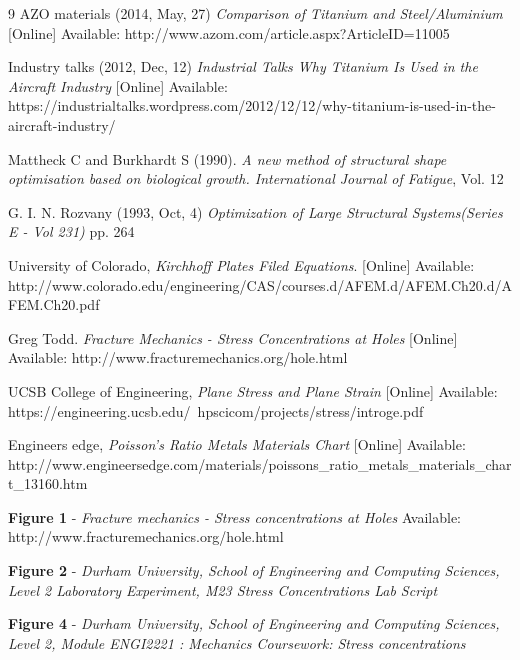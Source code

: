 \documentclass[11pt,twocolumn]{article} %
\begin{document}
\begin{thebibliography} {9} %
AZO materials (2014, May, 27) \textit{Comparison of Titanium and Steel/Aluminium} [Online] Available: http://www.azom.com/article.aspx?ArticleID=11005

Industry talks (2012, Dec, 12) \textit{Industrial Talks Why Titanium Is Used in the Aircraft Industry} [Online] Available: https://industrialtalks.wordpress.com/2012/12/12/why-titanium-is-used-in-the-aircraft-industry/

Mattheck C and Burkhardt S (1990). \textit{A new method of structural shape optimisation based on biological growth. International Journal of Fatigue}, Vol. 12

G. I. N. Rozvany (1993, Oct, 4) \textit{Optimization of Large Structural Systems(Series E - Vol 231)} pp. 264

University of Colorado, \textit{Kirchhoff Plates Filed Equations}. [Online] Available: http://www.colorado.edu/engineering/CAS/courses.d/AFEM.d/AFEM.Ch20.d/AFEM.Ch20.pdf 

Greg Todd. \textit{Fracture Mechanics - Stress Concentrations at Holes} [Online] Available: http://www.fracturemechanics.org/hole.html

UCSB College of Engineering, \textit{Plane Stress and Plane Strain} [Online] Available: https://engineering.ucsb.edu/~hpscicom/projects/stress/introge.pdf

Engineers edge, \textit{Poisson's Ratio Metals Materials Chart} [Online] Available: http://www.engineersedge.com/materials/poissons\_ratio\_metals\_materials\_chart\_13160.htm

\textbf{Figure 1} - \textit{Fracture mechanics - Stress concentrations at Holes} Available: http://www.fracturemechanics.org/hole.html

\textbf{Figure 2} - \textit{Durham University,
School of Engineering and Computing Sciences, Level 2 Laboratory Experiment, M23 Stress Concentrations Lab Script} 

\textbf{Figure 4} -  \textit{Durham University, School of Engineering and Computing Sciences, Level 2, Module ENGI2221 : Mechanics Coursework: Stress concentrations}

\end{thebibliography} 

\end{document}
